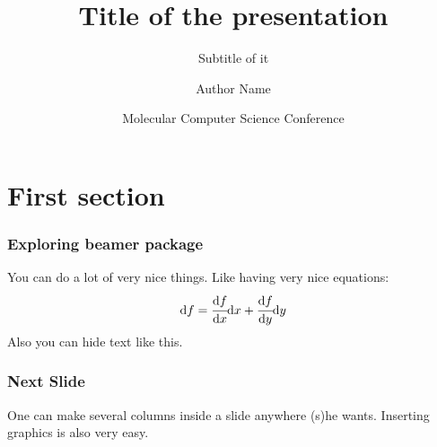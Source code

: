 \documentclass[utf8x,hyperref={unicode}]{beamer}
\title{Title of the presentation}
\subtitle{Subtitle of it}
\author{Author Name}
\date[] %
{Molecular Computer Science Conference}
\newcommand{\DD}[2]{\ensuremath{\cfrac{\mathrm{d} #1}{\mathrm{d} #2}}}
\newcommand{\dd}[1]{\ensuremath{\mathrm{d}#1}}
\begin{document}
\begin{frame}
  \titlepage
\end{frame}


\section{First section}

\begin{frame}
    \frametitle{Exploring beamer package}
    You can do a lot of very nice things. Like having very nice equations:
    \begin{equation}
        \dd f = \DD{f}{x}\dd x + \DD{f}{y}\dd y
        \label{eq:exact_diff}
    \end{equation}
    Also you can
    \pause
    hide
    \pause
    text
    \pause
    like
    \pause
    this.
\end{frame}

\begin{frame}
    \frametitle{Next Slide}
    One can make several columns inside a slide anywhere (s)he wants.
    Inserting graphics is also very easy.
\end{frame}
\end{document}
